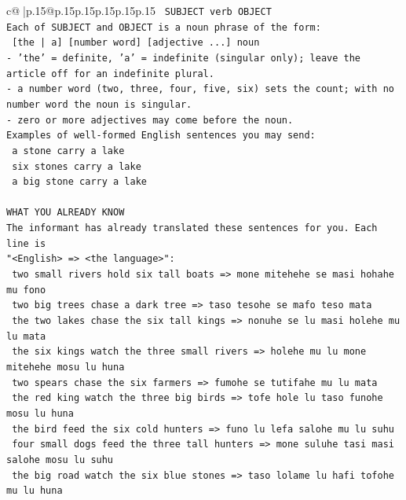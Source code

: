 \documentclass{article}
\begin{document}
{\begin{supertabular}{c@{$\;$}|p{.15\linewidth}@{}p{.15\linewidth}p{.15\linewidth}p{.15\linewidth}p{.15\linewidth}p{.15\linewidth}}
{{{\texttt{    SUBJECT  verb  OBJECT} \\
\texttt{Each of SUBJECT and OBJECT is a noun phrase of the form:} \\
\texttt{    {[}the | a{]}  {[}number word{]}  {[}adjective ...{]}  noun} \\
\texttt{{-} 'the' = definite, 'a' = indefinite (singular only); leave the article off for an indefinite plural.} \\
\texttt{{-} a number word (two, three, four, five, six) sets the count; with no number word the noun is singular.} \\
\texttt{{-} zero or more adjectives may come before the noun.} \\
\texttt{Examples of well{-}formed English sentences you may send:} \\
\texttt{    a stone carry a lake} \\
\texttt{    six stones carry a lake} \\
\texttt{    a big stone carry a lake} \\
\\ 
\texttt{WHAT YOU ALREADY KNOW} \\
\texttt{The informant has already translated these sentences for you. Each line is} \\
\texttt{"<English>  =>  <the language>":} \\
\texttt{    two small rivers hold six tall boats  =>  mone mitehehe se masi hohahe mu fono} \\
\texttt{    two big trees chase a dark tree  =>  taso tesohe se mafo teso mata} \\
\texttt{    the two lakes chase the six tall kings  =>  nonuhe se lu masi holehe mu lu mata} \\
\texttt{    the six kings watch the three small rivers  =>  holehe mu lu mone mitehehe mosu lu huna} \\
\texttt{    two spears chase the six farmers  =>  fumohe se tutifahe mu lu mata} \\
\texttt{    the red king watch the three big birds  =>  tofe hole lu taso funohe mosu lu huna} \\
\texttt{    the bird feed the six cold hunters  =>  funo lu lefa salohe mu lu suhu} \\
\texttt{    four small dogs feed the three tall hunters  =>  mone suluhe tasi masi salohe mosu lu suhu} \\
\texttt{    the big road watch the six blue stones  =>  taso lolame lu hafi tofohe mu lu huna} \\
}}}
\end{supertabular}}
\end{document}
